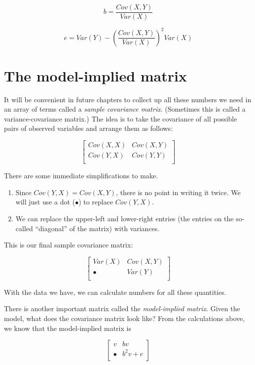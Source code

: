 \documentclass[
]{book}
\providecommand{\tightlist}{%
  \setlength{\itemsep}{0pt}\setlength{\parskip}{0pt}}
\begin{document}
\[
b = \frac{Cov(X, Y)}{Var(X)}
\]

\[
e = Var(Y) - \left( \frac{Cov(X, Y)}{Var(X)} \right)^2 Var(X)
\]

\hypertarget{simple-mim}{%
\section{The model-implied matrix}\label{simple-mim}}

It will be convenient in future chapters to collect up all these numbers we need in an array of terms called a \emph{sample covariance matrix}. (Sometimes this is called a variance-covariance matrix.) The idea is to take the covariance of all possible pairs of observed variables and arrange them as follows:

\[
\begin{bmatrix}
Cov(X, X)    &    Cov(X, Y) \\
Cov(Y, X)    &    Cov(Y, Y) \\
\end{bmatrix}
\]

There are some immediate simplifications to make.

\begin{enumerate}
\def\labelenumi{\arabic{enumi}.}
\tightlist
\item
  Since \(Cov(Y, X) = Cov(X, Y)\), there is no point in writing it twice. We will just use a dot (\(\bullet\)) to replace \(Cov(Y, X)\).
\item
  We can replace the upper-left and lower-right entries (the entries on the so-called ``diagonal'' of the matrix) with variances.
\end{enumerate}

This is our final sample covariance matrix:

\[
\begin{bmatrix}
Var(X)       &    Cov(X, Y) \\
\bullet      &    Var(Y)    \\
\end{bmatrix}
\]

With the data we have, we can calculate numbers for all these quantities.

There is another important matrix called the \emph{model-implied matrix}. Given the model, what does the covariance matrix look like? From the calculations above, we know that the model-implied matrix is

\[
\begin{bmatrix}
v         &    bv         \\
\bullet   &    b^{2}v + e \\
\end{bmatrix}
\]
\end{document}
